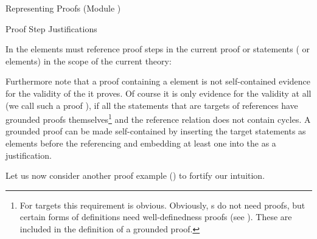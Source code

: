 \begin{omgroup}[id=proofs,short=Representing Proofs]{Representing Proofs (Module {})}
\begin{module}[id=justifications]
\begin{omgroup}[id=proofs.justifications]{Proof Step Justifications}
\begin{omtext}
  In \omdoc the  elements must reference proof steps in the current
  proof or statements ( or  elements) in the scope
  of the current theory: 
\end{omtext}

Furthermore note that a proof containing a  element is not
self-contained evidence for the validity of the  it proves.
Of course it is only evidence for the validity at all (we call such a proof
{}), if all the statements that are targets of
 references have grounded proofs themselves\footnote{For
   targets this requirement is obvious. Obviously,
  {s} do not need proofs, but certain forms of definitions need
  well-definedness proofs (see ). These are included in
  the definition of a grounded proof.} and the reference relation does not contain
cycles. A grounded proof can be made self-contained by inserting the target
statements as  elements before the referencing
 and embedding at least one  into the
 as a justification.

Let us now consider another proof example ({}) to fortify our intuition.


\end{omgroup}
\end{module}
\end{omgroup}
